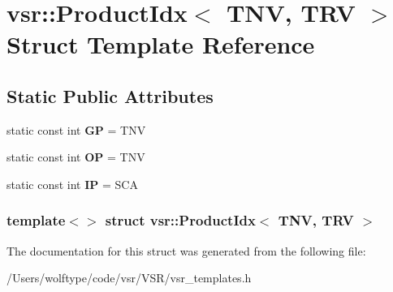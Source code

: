 \hypertarget{structvsr_1_1_product_idx_3_01_t_n_v_00_01_t_r_v_01_4}{\section{vsr\-:\-:Product\-Idx$<$ T\-N\-V, T\-R\-V $>$ Struct Template Reference}
\label{structvsr_1_1_product_idx_3_01_t_n_v_00_01_t_r_v_01_4}
}
\subsection*{Static Public Attributes}
\begin{DoxyCompactItemize}
\item 
\hypertarget{structvsr_1_1_product_idx_3_01_t_n_v_00_01_t_r_v_01_4_a0641b2222f0b6a22bddfdcf337b809b0}{static const int {\bfseries G\-P} = T\-N\-V}\label{structvsr_1_1_product_idx_3_01_t_n_v_00_01_t_r_v_01_4_a0641b2222f0b6a22bddfdcf337b809b0}

\item 
\hypertarget{structvsr_1_1_product_idx_3_01_t_n_v_00_01_t_r_v_01_4_aa1db1bbb049f9270cf9b1ce6a8ea12f6}{static const int {\bfseries O\-P} = T\-N\-V}\label{structvsr_1_1_product_idx_3_01_t_n_v_00_01_t_r_v_01_4_aa1db1bbb049f9270cf9b1ce6a8ea12f6}

\item 
\hypertarget{structvsr_1_1_product_idx_3_01_t_n_v_00_01_t_r_v_01_4_a48c2839777b5b57a8f526e6b9e33b662}{static const int {\bfseries I\-P} = S\-C\-A}\label{structvsr_1_1_product_idx_3_01_t_n_v_00_01_t_r_v_01_4_a48c2839777b5b57a8f526e6b9e33b662}

\end{DoxyCompactItemize}
\subsubsection*{template$<$$>$ struct vsr\-::\-Product\-Idx$<$ T\-N\-V, T\-R\-V $>$}



The documentation for this struct was generated from the following file\-:\begin{DoxyCompactItemize}
\item 
/\-Users/wolftype/code/vsr/\-V\-S\-R/vsr\-\_\-templates.\-h\end{DoxyCompactItemize}
